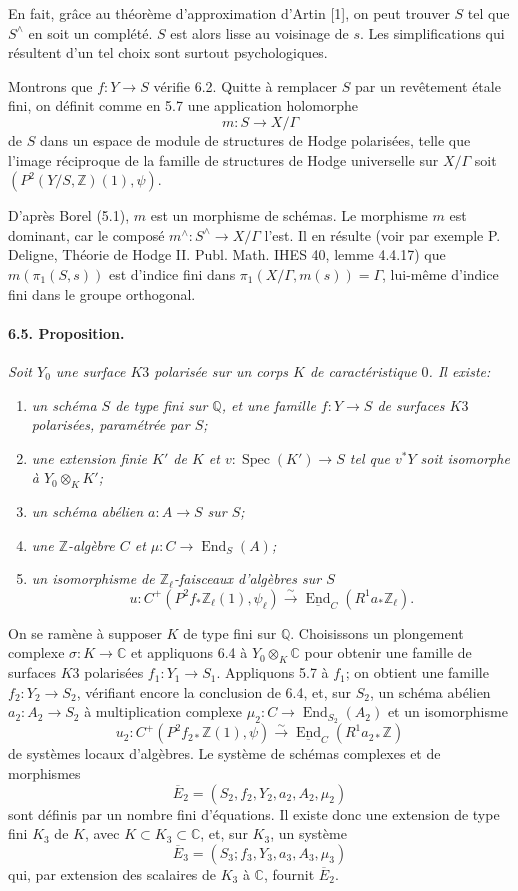 \documentclass[10pt,leqno]{article}
\newcommand{\C}{\mathbb{C}}
\newcommand{\Q}{\mathbb{Q}}
\newcommand{\Z}{\mathbb{Z}}
\newcommand{\Spec}{\operatorname{Spec}}
\newcommand{\End}{\operatorname{End}}
\newcommand{\iso}{\xrightarrow{\sim}}
\begin{document}
\clearpage

En fait, grâce au théorème d'approximation d'Artin [1], on peut trouver $S$ tel que $S^\wedge$ en soit un complété. $S$ est alors lisse au voisinage de $s$. Les simplifications qui résultent d'un tel choix sont surtout psychologiques.

Montrons que $f:Y\to S$ vérifie 6.2. Quitte à remplacer $S$ par un revêtement étale fini, on définit comme en 5.7 une application holomorphe
\[
m:S\longrightarrow X/\Gamma
\]
de $S$ dans un espace de module de structures de Hodge polarisées, telle que l'image réciproque de la famille de structures de Hodge universelle sur $X/\Gamma$ soit $(P^2(Y/S,\Z)(1),\psi)$.

D'après Borel (5.1), $m$ est un morphisme de schémas. Le morphisme $m$ est dominant, car le composé $m^\wedge:S^\wedge\to X/\Gamma$ l'est. Il en résulte (voir par exemple P. Deligne, Théorie de Hodge II. Publ. Math. IHES 40, lemme 4.4.17) que $m(\pi_1(S,s))$ est d'indice fini dans $\pi_1(X/\Gamma,m(s))=\Gamma$, lui-même d'indice fini dans le groupe orthogonal.

\paragraph{6.5. Proposition.} \emph{Soit $Y_0$ une surface $K3$ polarisée sur un corps $K$ de caractéristique $0$. Il existe:}
\begin{enumerate}[label=\alph*)]
\item \emph{un schéma $S$ de type fini sur $\Q$, et une famille $f:Y\to S$ de surfaces $K3$ polarisées, paramétrée par $S$;}
\item \emph{une extension finie $K'$ de $K$ et $v:\Spec(K')\to S$ tel que $v^*Y$ soit isomorphe à $Y_0\otimes_K K'$;}
\item \emph{un schéma abélien $a:A\to S$ sur $S$;}
\item \emph{une $\Z$-algèbre $C$ et $\mu:C\to\End_S(A)$;}
\item \emph{un isomorphisme de $\Z_\ell$-faisceaux d'algèbres sur $S$}
\[
u:C^+(P^2f_*\Z_\ell(1),\psi_\ell)\iso \underline{\End}_C(R^1a_*\Z_\ell).
\]
\end{enumerate}

On se ramène à supposer $K$ de type fini sur $\Q$. Choisissons un plongement complexe $\sigma:K\to\C$ et appliquons 6.4 à $Y_0\otimes_K\C$ pour obtenir une famille de surfaces $K3$ polarisées $f_1:Y_1\to S_1$. Appliquons 5.7 à $f_1$; on obtient une famille $f_2:Y_2\to S_2$, vérifiant encore la conclusion de 6.4, et, sur $S_2$, un schéma abélien $a_2:A_2\to S_2$ à multiplication complexe $\mu_2:C\to\End_{S_2}(A_2)$ et un isomorphisme
\[
u_2:C^+(P^2f_{2*}\Z(1),\psi)\iso \underline{\End}_C(R^1a_{2*}\Z)
\]
de systèmes locaux d'algèbres. Le système de schémas complexes et de morphismes
\[
\overline E_2=(S_2,f_2,Y_2,a_2,A_2,\mu_2)
\]
sont définis par un nombre fini d'équations. Il existe donc une extension de type fini $K_3$ de $K$, avec $K\subset K_3\subset\C$, et, sur $K_3$, un système
\[
\overline E_3=(S_3;f_3,Y_3,a_3,A_3,\mu_3)
\]
qui, par extension des scalaires de $K_3$ à $\C$, fournit $\overline E_2$.
\end{document}
